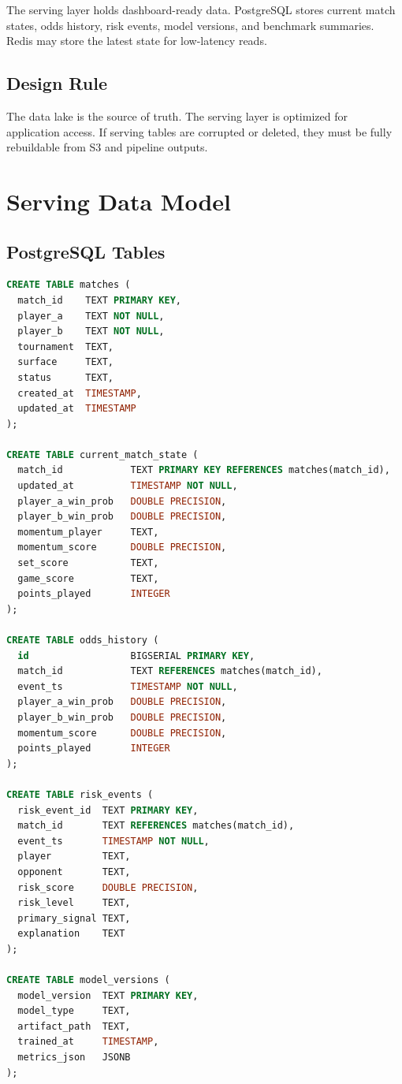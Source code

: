 \documentclass[11pt,a4paper]{article}
\begin{document}
The serving layer holds dashboard-ready data. PostgreSQL stores current match states, odds
history, risk events, model versions, and benchmark summaries. Redis may store the latest state
for low-latency reads.

\subsection{Design Rule}

The data lake is the source of truth. The serving layer is optimized for application access. If
serving tables are corrupted or deleted, they must be fully rebuildable from S3 and pipeline
outputs.

\section{Serving Data Model}

\subsection{PostgreSQL Tables}

\begin{lstlisting}[language=sql, caption={serving\_schema.sql}]
CREATE TABLE matches (
  match_id    TEXT PRIMARY KEY,
  player_a    TEXT NOT NULL,
  player_b    TEXT NOT NULL,
  tournament  TEXT,
  surface     TEXT,
  status      TEXT,
  created_at  TIMESTAMP,
  updated_at  TIMESTAMP
);

CREATE TABLE current_match_state (
  match_id            TEXT PRIMARY KEY REFERENCES matches(match_id),
  updated_at          TIMESTAMP NOT NULL,
  player_a_win_prob   DOUBLE PRECISION,
  player_b_win_prob   DOUBLE PRECISION,
  momentum_player     TEXT,
  momentum_score      DOUBLE PRECISION,
  set_score           TEXT,
  game_score          TEXT,
  points_played       INTEGER
);

CREATE TABLE odds_history (
  id                  BIGSERIAL PRIMARY KEY,
  match_id            TEXT REFERENCES matches(match_id),
  event_ts            TIMESTAMP NOT NULL,
  player_a_win_prob   DOUBLE PRECISION,
  player_b_win_prob   DOUBLE PRECISION,
  momentum_score      DOUBLE PRECISION,
  points_played       INTEGER
);

CREATE TABLE risk_events (
  risk_event_id  TEXT PRIMARY KEY,
  match_id       TEXT REFERENCES matches(match_id),
  event_ts       TIMESTAMP NOT NULL,
  player         TEXT,
  opponent       TEXT,
  risk_score     DOUBLE PRECISION,
  risk_level     TEXT,
  primary_signal TEXT,
  explanation    TEXT
);

CREATE TABLE model_versions (
  model_version  TEXT PRIMARY KEY,
  model_type     TEXT,
  artifact_path  TEXT,
  trained_at     TIMESTAMP,
  metrics_json   JSONB
);
\end{lstlisting}
\end{document}
